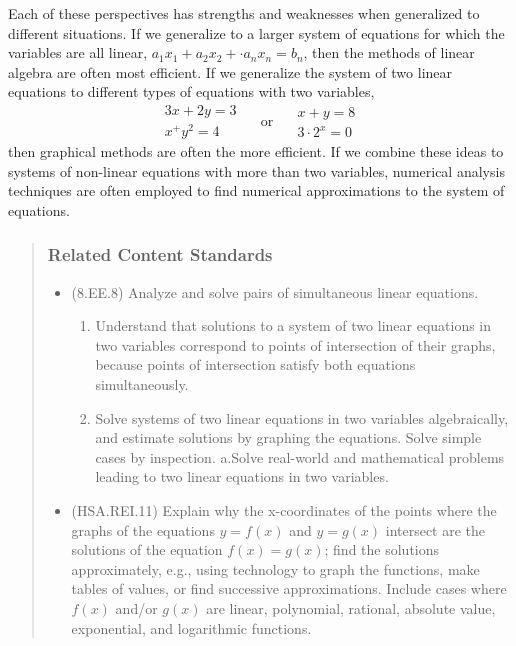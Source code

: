 \documentclass[
]{book}
\providecommand{\tightlist}{%
  \setlength{\itemsep}{0pt}\setlength{\parskip}{0pt}}
\theoremstyle{definition}
\theoremstyle{definition}
\theoremstyle{definition}
\theoremstyle{remark}
\begin{document}
Each of these perspectives has strengths and weaknesses when generalized to different situations. If we generalize to a larger system of equations for which the variables are all linear, \(a_1 x_1 + a_2 x_2 + \cdot a_n x_n = b_n\), then the methods of linear algebra are often most efficient. If we generalize the system of two linear equations to different types of equations with two variables,
\[\begin{matrix} 3x+2y=3 \\ x^+y^2=4  \end{matrix} \quad \mbox{ or } \quad \begin{matrix} x+y=8 \\ 3\cdot 2^x = 0 \end{matrix}\] then graphical methods are often the more efficient. If we combine these ideas to systems of non-linear equations with more than two variables, numerical analysis techniques are often employed to find numerical approximations to the system of equations.

\begin{quote}
\hypertarget{related-content-standards-62}{%
\subsubsection*{Related Content Standards}\label{related-content-standards-62}}

\begin{itemize}
\tightlist
\item
  (8.EE.8) Analyze and solve pairs of simultaneous linear equations.

  \begin{enumerate}
  \def\labelenumi{\alph{enumi}.}
  \tightlist
  \item
    Understand that solutions to a system of two linear equations in two variables correspond to points of intersection of their graphs, because points of intersection satisfy both equations simultaneously.
  \item
    Solve systems of two linear equations in two variables algebraically, and estimate solutions by graphing the equations. Solve simple cases by inspection.
    a.Solve real-world and mathematical problems leading to two linear equations in two variables.
  \end{enumerate}
\item
  (HSA.REI.11) Explain why the x-coordinates of the points where the graphs of the equations \(y = f(x)\) and \(y = g(x)\) intersect are the solutions of the equation \(f(x) = g(x)\); find the solutions approximately, e.g., using technology to graph the functions, make tables of values, or find successive approximations. Include cases where \(f(x)\) and/or \(g(x)\) are linear, polynomial, rational, absolute value, exponential, and logarithmic functions.
\end{itemize}
\end{quote}
\end{document}
